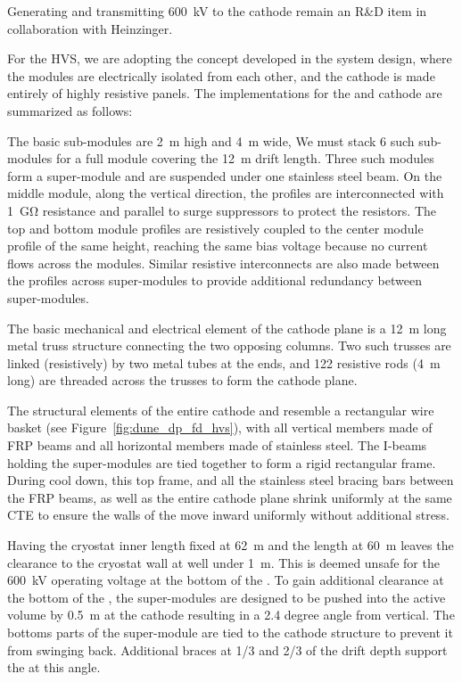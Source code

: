 Generating and transmitting \SI{600}{\kV} to the cathode remain an R\&D item in collaboration with Heinzinger.

For the \dual {} HVS, we are adopting the concept developed in the \single {}  system design, where the  modules are electrically isolated from each other, and the cathode is made entirely of highly resistive panels.  The implementations for the  and cathode are summarized as follows:
    
The basic  sub-modules are \SI{2}{\m} high and \SI{4}{\m} wide, We must stack \num{6} such sub-modules for a full module covering the \SI{12}{\m} drift length. Three such modules form a super-module  and are suspended under one stainless steel beam.  On the middle module, along the vertical direction, the  profiles are interconnected with \SI{1}{\giga\ohm} resistance and parallel to surge suppressors to protect the resistors. The top and bottom module profiles are resistively coupled to the center module profile of the same height, reaching the same bias voltage because no current flows across the modules.  Similar resistive interconnects are also made between the profiles across super-modules to provide additional redundancy between super-modules.

The basic mechanical and electrical element of the cathode plane is a \SI{12}{\m} long metal truss structure connecting the two opposing  columns.  Two such trusses are linked (resistively) by two metal tubes at the ends, and \num{122} resistive rods (\SI{4}{\m} long) are threaded across the trusses to form the cathode plane.  

The structural elements of the entire cathode and  resemble a rectangular wire basket (see Figure~\ref{fig:dune_dp_fd_hvs}), with all vertical members made of FRP beams and all horizontal members made of stainless steel.  The I-beams holding the  super-modules are  tied together to form a rigid rectangular frame.  During cool down, this top frame, and all the stainless steel bracing bars between the  FRP beams, as well as the entire cathode plane shrink uniformly at the same CTE to ensure the walls of the  move inward uniformly without additional stress.

Having the cryostat inner length fixed at \SI{62}{\m} and the  length at \SI{60}{\m} leaves the \endwall {} clearance to the cryostat wall at well under \SI{1}{\m}.  This is deemed unsafe for the \SI{600}{\kV} operating voltage at the bottom of the .  To gain additional clearance at the bottom of the , the \endwall {} super-modules are designed to be pushed into the active volume by \SI{0.5}{\m} at the cathode resulting in a \num{2.4} degree angle from vertical.  The bottoms parts of the \endwall super-module are tied to the cathode structure to prevent it from swinging back.  Additional braces at 1/3 and 2/3 of the drift depth support the \endwall {} at this angle.

